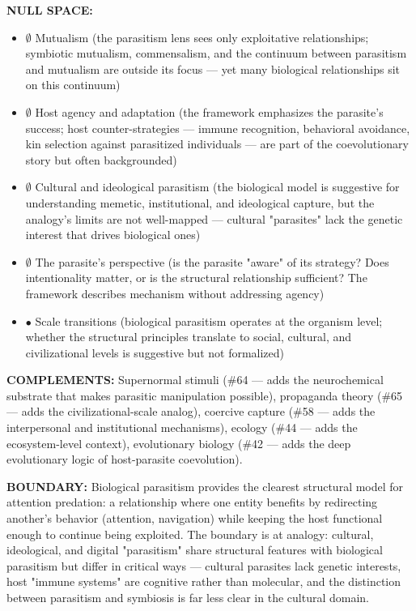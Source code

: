 \textbf{NULL SPACE:}

\begin{itemize}[nosep,leftmargin=*]
  \item $\emptyset$ Mutualism (the parasitism lens sees only exploitative relationships; symbiotic mutualism, commensalism, and the continuum between parasitism and mutualism are outside its focus — yet many biological relationships sit on this continuum)
  \item $\emptyset$ Host agency and adaptation (the framework emphasizes the parasite's success; host counter-strategies — immune recognition, behavioral avoidance, kin selection against parasitized individuals — are part of the coevolutionary story but often backgrounded)
  \item $\emptyset$ Cultural and ideological parasitism (the biological model is suggestive for understanding memetic, institutional, and ideological capture, but the analogy's limits are not well-mapped — cultural "parasites" lack the genetic interest that drives biological ones)
  \item $\emptyset$ The parasite's perspective (is the parasite "aware" of its strategy? Does intentionality matter, or is the structural relationship sufficient? The framework describes mechanism without addressing agency)
  \item $\bullet$ Scale transitions (biological parasitism operates at the organism level; whether the structural principles translate to social, cultural, and civilizational levels is suggestive but not formalized)
\end{itemize}


\textbf{COMPLEMENTS:} Supernormal stimuli (\#64 — adds the neurochemical substrate that makes parasitic manipulation possible), propaganda theory (\#65 — adds the civilizational-scale analog), coercive capture (\#58 — adds the interpersonal and institutional mechanisms), ecology (\#44 — adds the ecosystem-level context), evolutionary biology (\#42 — adds the deep evolutionary logic of host-parasite coevolution).


\textbf{BOUNDARY:} Biological parasitism provides the clearest structural model for attention predation: a relationship where one entity benefits by redirecting another's behavior (attention, navigation) while keeping the host functional enough to continue being exploited. The boundary is at analogy: cultural, ideological, and digital "parasitism" share structural features with biological parasitism but differ in critical ways — cultural parasites lack genetic interests, host "immune systems" are cognitive rather than molecular, and the distinction between parasitism and symbiosis is far less clear in the cultural domain.


